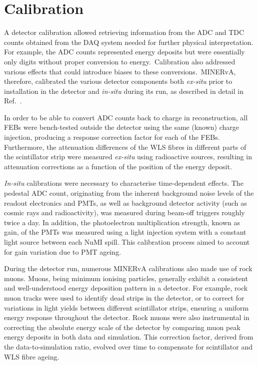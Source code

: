 \section{Calibration}\label{sec:calibration}

A detector calibration allowed retrieving information from the ADC and TDC counts obtained from the DAQ system needed for further physical interpretation. For example, the ADC counts represented energy deposits but were essentially only digits without proper conversion to energy.~Calibration also addressed various effects that could introduce biases to these conversions.~MINERvA, therefore, calibrated the various detector components both \textit{ex-situ} prior to installation in the detector and \textit{in-situ} during its run, as described in detail in Ref.~\cite{Aliaga_2014}.%

In order to be able to convert ADC counts back to charge in reconstruction, all FEBs were bench-tested outside the detector using the same (known) charge injection, producing a response correction factor for each of the FEBs. Furthermore, the attenuation differences of the WLS fibres in different parts of the scintillator strip were measured \textit{ex-situ} using radioactive sources, resulting in attenuation corrections as a function of the position of the energy deposit. 

\textit{In-situ} calibrations were necessary to characterise time-dependent effects. The pedestal ADC count, originating from the inherent background noise levels of the readout electronics and PMTs, as well as background detector activity (such as cosmic rays and radioactivity), was measured during beam-off triggers roughly twice a day. In addition, the photoelectron multiplication strength, known as gain, of the PMTs was measured using a light injection system with a constant light source between each NuMI spill. This calibration process aimed to account for gain variation due to PMT ageing. 


During the detector run, numerous MINERvA calibrations also made use of rock muons. Muons, being minimum ionising particles, generally exhibit a consistent and well-understood energy deposition pattern in a detector. For example, rock muon tracks were used to identify dead strips in the detector, or to correct for variations in light yields between different scintillator strips, ensuring a uniform energy response throughout the detector. Rock muons were also instrumental in correcting the absolute energy scale of the detector by comparing muon peak energy deposits in both data and simulation. This correction factor, derived from the data-to-simulation ratio, evolved over time to compensate for scintillator and WLS fibre ageing. 

